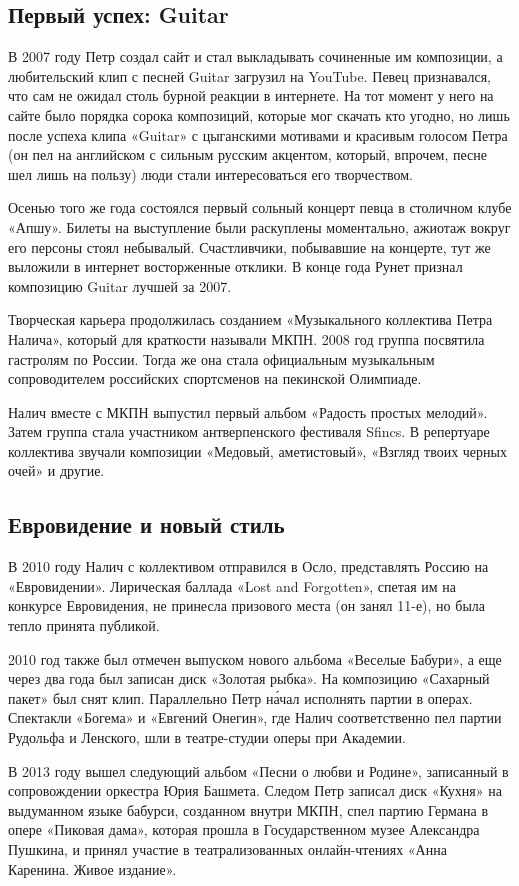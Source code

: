 \subsection{Первый успех: Guitar}
В 2007 году Петр создал сайт и стал выкладывать сочиненные им композиции, а любительский клип с песней Guitar загрузил на YouTube. Певец признавался, что сам не ожидал столь бурной реакции в интернете. На тот момент у него на сайте было порядка сорока композиций, которые мог скачать кто угодно, но лишь после успеха клипа «Guitar» с цыганскими мотивами и красивым голосом Петра (он пел на английском с сильным русским акцентом, который, впрочем, песне шел лишь на пользу) люди стали интересоваться его творчеством.

Осенью того же года состоялся первый сольный концерт певца в столичном клубе «Апшу». Билеты на выступление были раскуплены моментально, ажиотаж вокруг его персоны стоял небывалый. Счастливчики, побывавшие на концерте, тут же выложили в интернет восторженные отклики. В конце года Рунет признал композицию Guitar лучшей за 2007.

Творческая карьера продолжилась созданием «Музыкального коллектива Петра Налича», который для краткости называли МКПН. 2008 год группа посвятила гастролям по России. Тогда же она стала официальным музыкальным сопроводителем российских спортсменов на пекинской Олимпиаде.

Налич вместе с МКПН выпустил первый альбом «Радость простых мелодий». Затем группа стала участником антверпенского фестиваля Sfincs. В репертуаре коллектива звучали композиции «Медовый, аметистовый», «Взгляд твоих черных очей» и другие.

\subsection{Евровидение и новый стиль}
В 2010 году Налич с коллективом отправился в Осло, представлять Россию на «Евровидении». Лирическая баллада «Lost and Forgotten», спетая им на конкурсе Евровидения, не принесла призового места (он занял 11-е), но была тепло принята публикой.

2010 год также был отмечен выпуском нового альбома «Веселые Бабури», а еще через два года был записан диск «Золотая рыбка». На композицию «Сахарный пакет» был снят клип. Параллельно Петр н\'{а}чал исполнять партии в операх. Спектакли «Богема» и «Евгений Онегин», где Налич соответственно пел партии Рудольфа и Ленского, шли в театре-студии оперы при Академии.

В 2013 году вышел следующий альбом «Песни о любви и Родине», записанный в сопровождении оркестра Юрия Башмета. Следом Петр записал диск «Кухня» на выдуманном языке бабурси, созданном внутри МКПН, спел партию Германа в опере «Пиковая дама», которая прошла в Государственном музее Александра Пушкина, и принял участие в театрализованных онлайн-чтениях «Анна Каренина. Живое издание».

